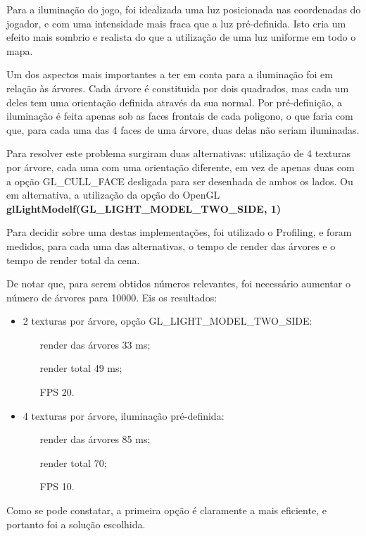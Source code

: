 Para a iluminação do jogo, foi idealizada uma luz posicionada nas coordenadas do jogador, e com uma intensidade mais fraca que a luz pré-definida. Isto cria um efeito mais sombrio e realista do que a utilização de uma luz uniforme em todo o mapa.

Um dos aspectos mais importantes a ter em conta para a iluminação foi em relação às árvores. Cada árvore é constituida por dois quadrados, mas cada um deles tem uma orientação definida através da sua normal.
Por pré-definição, a iluminação é feita apenas sob as faces frontais de cada poligono, o que faria com que, para cada uma das 4 faces de uma árvore, duas delas não seriam iluminadas.

Para resolver este problema surgiram duas alternativas: utilização de 4 texturas por árvore, cada uma com uma orientação diferente, em vez de apenas duas com a opção GL\_CULL\_FACE desligada para ser desenhada de ambos os lados. Ou em alternativa, a utilização da opção do OpenGL \textbf{glLightModelf(GL\_LIGHT\_MODEL\_TWO\_SIDE, 1)}

Para decidir sobre uma destas implementações, foi utilizado o Profiling, e foram medidos, para cada uma das alternativas, o tempo de render das árvores e o tempo de render total da cena.

De notar que, para serem obtidos números relevantes, foi necessário aumentar o número de árvores para 10000.
Eis os resultados:
\begin{itemize}
\item 2 texturas por árvore, opção GL\_LIGHT\_MODEL\_TWO\_SIDE:
	\begin{itemize}
		\item[render das árvores] 33 ms;
		\item[render total]	49 ms;
		\item[FPS] 20.
	\end{itemize}
\item 4 texturas por árvore, iluminação pré-definida:
	\begin{itemize}
		\item[render das árvores] 85 ms;
		\item[render total]	70;
		\item[FPS] 10. 
	\end{itemize}
\end{itemize}

Como se pode constatar, a primeira opção é claramente a mais eficiente, e portanto foi a solução escolhida.
